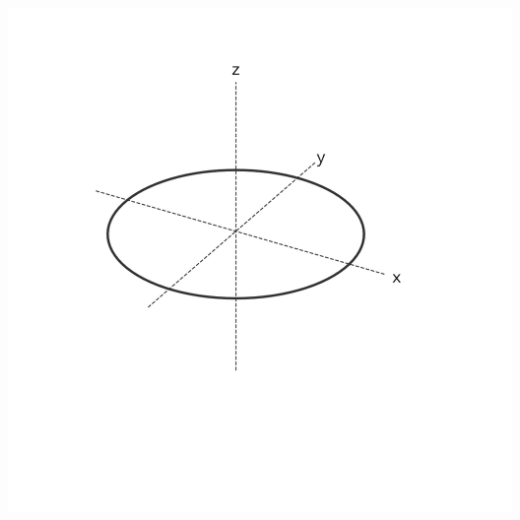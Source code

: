 \documentclass[a4paper, 10pt, notitlepage, twocolumn, uplatex, oneside, dvipdfmx]{jsarticle}
\begin{document}
\label{}
\begin{center}
\includegraphics[width=1.0\linewidth]{./obipy-resources/lines_3d.png}
\end{center}
\end{document}
